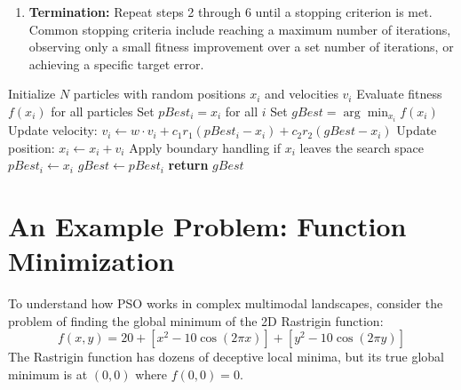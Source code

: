 \documentclass[12pt,a4paper]{article}
\begin{document}
\begin{enumerate}
    \begin{equation}
        x_i(t+1) = x_i(t) + v_i(t+1)
    \end{equation}
    If a particle moves outside the search bounds, boundary handling techniques (e.g., absorbing or reflecting walls) must be applied to bring it back into the valid space.
    \item \textbf{Termination:} Repeat steps 2 through 6 until a stopping criterion is met. Common stopping criteria include reaching a maximum number of iterations, observing only a small fitness improvement over a set number of iterations, or achieving a specific target error.
\end{enumerate}

\begin{algorithm}[H]
\caption*{PSO Pseudocode for Minimization}
\small
\begin{algorithmic}[1]
\State Initialize $N$ particles with random positions $x_i$ and velocities $v_i$
\State Evaluate fitness $f(x_i)$ for all particles
\State Set $pBest_i = x_i$ for all $i$
\State Set $gBest = \arg\min_{x_i} f(x_i)$
        \State Update velocity: $v_i \gets w \cdot v_i + c_1 r_1 (pBest_i - x_i) + c_2 r_2 (gBest - x_i)$
        \State Update position: $x_i \gets x_i + v_i$
        \State Apply boundary handling if $x_i$ leaves the search space
            \State $pBest_i \gets x_i$
        \EndIf
            \State $gBest \gets pBest_i$
        \EndIf
    \EndFor
\EndWhile
\State \textbf{return} $gBest$
\end{algorithmic}
\end{algorithm}

\section{An Example Problem: Function Minimization}
To understand how PSO works in complex multimodal landscapes, consider the problem of finding the global minimum of the 2D Rastrigin function: 
\begin{equation*}
    f(x, y) = 20 + \left[x^2 - 10\cos(2\pi x)\right] + \left[y^2 - 10\cos(2\pi y)\right]
\end{equation*}
The Rastrigin function has dozens of deceptive local minima, but its true global minimum is at $(0,0)$ where $f(0,0) = 0$.
\end{document}
